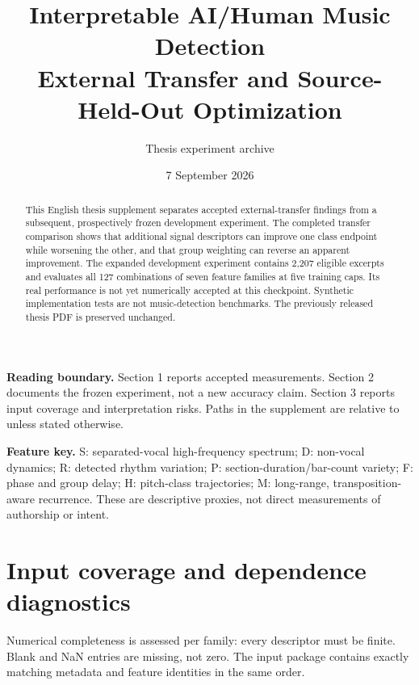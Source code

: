 \documentclass[11pt,a4paper]{article}
\title{Interpretable AI/Human Music Detection\\\large External Transfer and Source-Held-Out Optimization}
\author{Thesis experiment archive}
\date{7 September 2026}
\begin{document}
\maketitle
\begin{abstract}
This English thesis supplement separates accepted external-transfer findings
from a subsequent, prospectively frozen development experiment. The completed
transfer comparison shows that additional signal descriptors can improve one
class endpoint while worsening the other, and that group weighting can reverse
an apparent improvement. The expanded development experiment contains 2,207
eligible excerpts and evaluates all 127 combinations of seven feature families
at five training caps. Its real performance is not yet numerically accepted at
this checkpoint. Synthetic implementation tests are not music-detection
benchmarks. The previously released thesis PDF is preserved unchanged.
\end{abstract}
\textbf{Reading boundary.} Section 1 reports accepted measurements. Section 2
documents the frozen experiment, not a new accuracy claim. Section 3 reports
input coverage and interpretation risks. Paths in the supplement are relative
to  unless stated otherwise.

\textbf{Feature key.} S: separated-vocal high-frequency spectrum;
D: non-vocal dynamics; R: detected rhythm variation;
P: section-duration/bar-count variety; F: phase and group delay;
H: pitch-class trajectories; M: long-range, transposition-aware recurrence.
These are descriptive proxies, not direct measurements of authorship or intent.


\clearpage

\clearpage
\section{Input coverage and dependence diagnostics}
\label{sec:v5-coverage-balance}

Numerical completeness is assessed per family: every descriptor must be finite.
Blank and NaN entries are missing, not zero. The input package contains exactly
matching metadata and feature identities in the same order.
\end{document}
